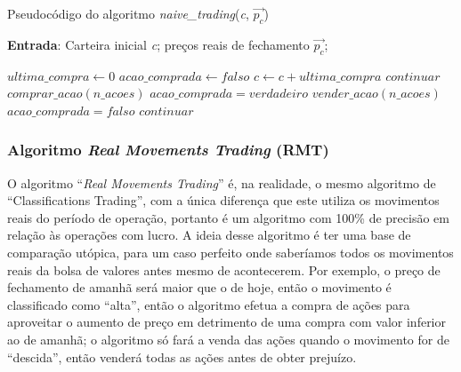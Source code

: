 \begin{algorithm}[H]
\caption{Pseudocódigo do algoritmo \textit{naive\_trading}(\textit{c}, $ \vec{p_c} $)}
\scriptsize
\textbf{Entrada}: Carteira inicial \textit{c}; preços reais de fechamento $ \vec{p_c} $;
\begin{algorithmic}[1]
\footnotesize
{}
    \State $ultima\_compra\gets 0$
    \State $acao\_comprada\gets falso$
                \State $c \gets c + ultima\_compra$
            \Else
                        \State $continuar$
                    \Else
                        \State $comprar\_acao(n\_acoes)$
                        \State $acao\_comprada = verdadeiro$
                    \EndIf
                \Else
                        \State $vender\_acao(n\_acoes)$
                        \State $acao\_comprada = falso$
                    \Else
                        \State $continuar$
                    \EndIf
                \EndIf
            \EndIf
        \EndFor
\EndFunction
\end{algorithmic}
\end{algorithm}


\subsubsection{Algoritmo \textit{Real Movements Trading} (RMT)}


\par
O algoritmo “\textit{Real Movements Trading}” é, na realidade, o mesmo algoritmo de “Classifications Trading”, com a única diferença que este utiliza os movimentos reais do período de operação, portanto é um algoritmo com 100\% de precisão em relação às operações com lucro. A ideia desse algoritmo é ter uma base de comparação utópica, para um caso perfeito onde saberíamos todos os movimentos reais da bolsa de valores antes mesmo de acontecerem. Por exemplo, o preço de fechamento de amanhã será maior que o de hoje, então o movimento é classificado como “alta”, então o algoritmo efetua a compra de ações para aproveitar o aumento de preço em detrimento de uma compra com valor inferior ao de amanhã; o algoritmo só fará a venda das ações quando o movimento for de “descida”, então venderá todas as ações antes de obter prejuízo.


